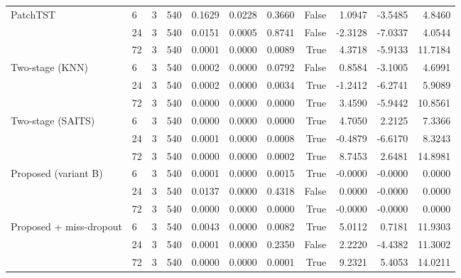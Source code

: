 \begin{table}
\begin{tabular}{llrrrrrrrrr}
\cline{1-11}
\multirow[t]{3}{*}{PatchTST} & 6 & 3 & 540 & 0.1629 & 0.0228 & 0.3660 & False & 1.0947 & -3.5485 & 4.8460 \\
 & 24 & 3 & 540 & 0.0151 & 0.0005 & 0.8741 & False & -2.3128 & -7.0337 & 4.0544 \\
 & 72 & 3 & 540 & 0.0001 & 0.0000 & 0.0089 & True & 4.3718 & -5.9133 & 11.7184 \\
\cline{1-11}
\multirow[t]{3}{*}{Two-stage (KNN)} & 6 & 3 & 540 & 0.0002 & 0.0000 & 0.0792 & False & 0.8584 & -3.1005 & 4.6991 \\
 & 24 & 3 & 540 & 0.0002 & 0.0000 & 0.0034 & True & -1.2412 & -6.2741 & 5.9089 \\
 & 72 & 3 & 540 & 0.0000 & 0.0000 & 0.0000 & True & 3.4590 & -5.9442 & 10.8561 \\
\cline{1-11}
\multirow[t]{3}{*}{Two-stage (SAITS)} & 6 & 3 & 540 & 0.0000 & 0.0000 & 0.0000 & True & 4.7050 & 2.2125 & 7.3366 \\
 & 24 & 3 & 540 & 0.0001 & 0.0000 & 0.0008 & True & -0.4879 & -6.6170 & 8.3243 \\
 & 72 & 3 & 540 & 0.0000 & 0.0000 & 0.0002 & True & 8.7453 & 2.6481 & 14.8981 \\
\cline{1-11}
\multirow[t]{3}{*}{Proposed (variant B)} & 6 & 3 & 540 & 0.0001 & 0.0000 & 0.0015 & True & -0.0000 & -0.0000 & 0.0000 \\
 & 24 & 3 & 540 & 0.0137 & 0.0000 & 0.4318 & False & 0.0000 & -0.0000 & 0.0000 \\
 & 72 & 3 & 540 & 0.0000 & 0.0000 & 0.0000 & True & -0.0000 & -0.0000 & 0.0000 \\
\cline{1-11}
\multirow[t]{3}{*}{Proposed + miss-dropout} & 6 & 3 & 540 & 0.0043 & 0.0000 & 0.0082 & True & 5.0112 & 0.7181 & 11.9303 \\
 & 24 & 3 & 540 & 0.0001 & 0.0000 & 0.2350 & False & 2.2220 & -4.4382 & 11.3002 \\
 & 72 & 3 & 540 & 0.0000 & 0.0000 & 0.0001 & True & 9.2321 & 5.4053 & 14.0211 \\
\cline{1-11}
\bottomrule
\end{tabular}
\end{table}
